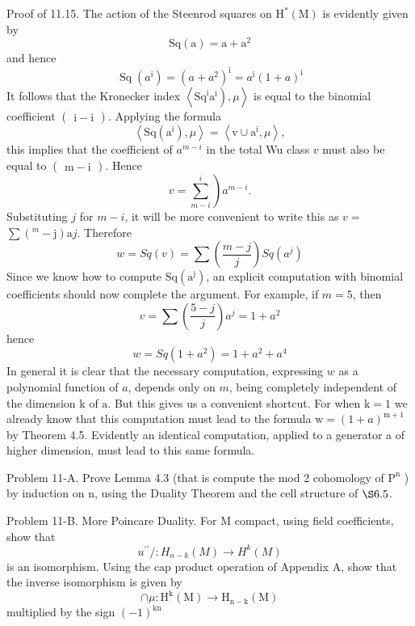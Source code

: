\documentclass[10pt]{article}
\begin{document}
Proof of 11.15. The action of the Steenrod squares on $\mathrm{H}^{*}(\mathrm{M})$ is evidently given by
$$
\mathrm{Sq}(\mathrm{a})=\mathrm{a}+\mathrm{a}^{2}
$$
and hence
$$
\operatorname{Sq}\left(a^{\mathrm{i}}\right)=\left(a+a^{2}\right)^{\mathrm{i}}=a^{\mathrm{i}}(1+a)^{\mathrm{i}}
$$
It follows that the Kronecker index $\left.\left\langle\mathrm{Sq}^{\mathrm{i}} \mathrm{a}^{\mathrm{i}}\right), \mu\right\rangle$ is equal to the binomial coefficient $\left(\begin{array}{c}\mathrm{i}-\mathrm{i}\end{array}\right)$. Applying the formula
$$
\left\langle\mathrm{Sq}\left(\mathrm{a}^{\mathrm{i}}\right), \mu\right\rangle=\left\langle\mathrm{v} \cup \mathrm{a}^{\mathrm{i}}, \mu\right\rangle,
$$
this implies that the coefficient of $a^{m-i}$ in the total Wu class $v$ must also be equal to $\left(\begin{array}{c}\mathrm{m}-\mathrm{i}\end{array}\right)$. Hence
$$
\left.v=\sum_{m-i}^{i}\right) a^{m-i} .
$$
Substituting $j$ for $m-i$, it will be more convenient to write this as $v=$ $\sum\left({ }^{m}-\mathrm{j}\right) \mathrm{a} j$. Therefore
$$
w=S q(v)=\sum\left(\frac{m-j}{j}\right) S q\left(a^{j}\right)
$$
Since we know how to compute $\mathrm{Sq}\left(\mathrm{a}^{\mathrm{j}}\right)$, an explicit computation with binomial coefficients should now complete the argument. For example, if $m=5$, then
$$
v=\sum\left(\frac{5-j}{j}\right) a^{j}=1+a^{2}
$$
hence
$$
w=S q\left(1+a^{2}\right)=1+a^{2}+a^{4}
$$
In general it is clear that the necessary computation, expressing $w$ as a polynomial function of $a$, depends only on $m$, being completely independent of the dimension $\mathrm{k}$ of $\mathrm{a}$. But this gives us a convenient shortcut. For when $\mathrm{k}=1$ we already know that this computation must lead to the formula $\mathrm{w}=(1+a)^{\mathrm{m}+1}$ by Theorem 4.5. Evidently an identical computation, applied to a generator a of higher dimension, must lead to this same formula.

Problem 11-A. Prove Lemma 4.3 (that is compute the mod 2 cohomology of $\mathrm{P}^{\mathrm{n}}$ ) by induction on $\mathrm{n}$, using the Duality Theorem and the cell structure of $\S 6.5$.

Problem 11-B. More Poincare Duality. For M compact, using field coefficients, show that
$$
u^{\prime \prime} /: H_{n-k}(M) \rightarrow H^{k}(M)
$$
is an isomorphism. Using the cap product operation of Appendix A, show that the inverse isomorphism is given by
$$
\cap \mu: \mathrm{H}^{\mathrm{k}}(\mathrm{M}) \rightarrow \mathrm{H}_{\mathrm{n}-\mathrm{k}}(\mathrm{M})
$$
multiplied by the sign $(-1)^{\mathrm{kn}}$
\end{document}
